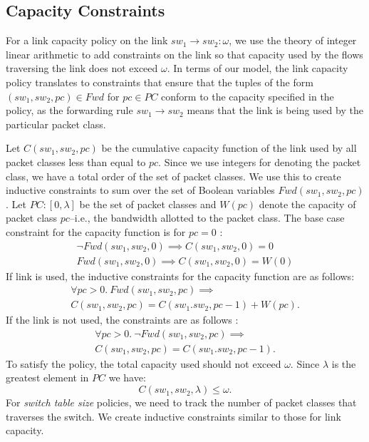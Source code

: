 \subsection{Capacity Constraints}
For a link capacity policy on the link $sw_1 \rightarrow sw_2: \omega$, we use the theory of integer linear arithmetic to add constraints on the link so that capacity used by the flows traversing the link does not exceed $\omega$. 
In terms of our model, the link capacity policy translates to constraints that
ensure that the tuples of the form $(sw_1, sw_2, pc) \in Fwd$ for $pc \in PC$ conform to the capacity specified in the policy, 
as the forwarding rule $sw_1 \rightarrow sw_2$ means that the link is being used by the particular packet class.
 
Let $C(sw_1,sw_2,pc)$ be the cumulative capacity function of the link used by all packet classes less than equal to $pc$. Since we use integers for denoting the packet class, we have a total order of the set of packet classes. We use this to create inductive constraints to sum over the set of Boolean variables $Fwd(sw_1, sw_2,pc)$. Let $PC : [0, \lambda]$ be the set of packet classes and $W(pc)$ 
denote the capacity of packet class $pc$--i.e., the bandwidth allotted to the packet class. 
The base case constraint for the capacity function is for $pc = 0$ :
\begin{multline}
\neg Fwd(sw_1, sw_2, 0) \implies C(sw_1, sw_2, 0) = 0 \\
	Fwd(sw_1, sw_2, 0) \implies C(sw_1, sw_2, 0) = W(0)
\end{multline} 
If link is used, the inductive constraints for the capacity function are as follows:
\begin{multline}
	\forall pc > 0.~Fwd(sw_1,sw_2,pc) \implies \\ C(sw_1, sw_2, pc) =  C(sw_1. sw_2, pc - 1) + W(pc).
\end{multline}
If the link is not used, the constraints are as follows : 
\begin{multline}
\forall pc > 0.~\neg Fwd(sw_1,sw_2,pc) \implies \\ C(sw_1, sw_2, pc) =  C(sw_1. sw_2, pc - 1).
\end{multline}
To satisfy the policy, the total capacity used should not exceed $\omega$. 
Since $\lambda$ is the greatest element in $PC$ we have:
\begin{equation}
	C(sw_1, sw_2, \lambda) \leq \omega.
\end{equation} 
For \emph{switch table size} policies, we need to track the number of packet classes that traverses the switch.
We create inductive constraints similar to those for link capacity.
